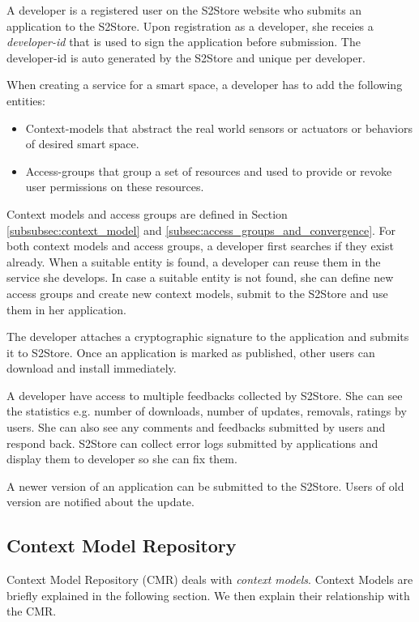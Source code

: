 A developer is a registered user on the S2Store website who submits an application to the S2Store. Upon registration as a developer, she receies a \emph{developer-id} that is used to sign the application before submission. The developer-id is auto generated by the S2Store and unique per developer.

When creating a service for a smart space, a developer has to add the following entities:

\begin{itemize}
  \item Context-models that abstract the real world sensors or actuators or behaviors of desired smart space.
  \item Access-groups that group a set of resources and used to provide or revoke user permissions on these resources.
\end{itemize}

Context models and access groups are defined in Section \ref{subsubsec:context_model} and \ref{subsec:access_groups_and_convergence}. For both context models and access groups, a developer first searches if they exist already. When a suitable entity is found, a developer can reuse them in the service she develops. In case a suitable entity is not found, she can define new access groups and create new context models, submit to the S2Store and use them in her application.

The developer attaches a cryptographic signature to the application and submits it to S2Store. Once an application is marked as published, other users can download and install immediately.

A developer have access to multiple feedbacks collected by S2Store. She can see the statistics e.g. number of downloads, number of updates, removals, ratings by users. She can also see any comments and feedbacks submitted by users and respond back. S2Store can collect error logs submitted by applications and display them to developer so she can fix them.

A newer version of an application can be submitted to the S2Store. Users of old version are notified about the update.

\subsection{Context Model Repository}
\label{subsec:cmr}

Context Model Repository (CMR) deals with \emph{context models}. Context Models are briefly explained in the following section. We then explain their relationship with the CMR.

